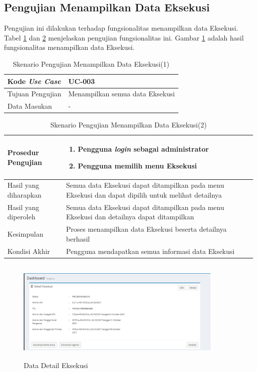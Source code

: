 \subsection{Pengujian Menampilkan Data Eksekusi}
Pengujian ini dilakukan terhadap fungsionalitas menampilkan data Eksekusi. Tabel \ref{tab:list_eksekusi_1} dan \ref{tab:list_eksekusi_2} menjelaskan pengujian fungsionalitas ini. Gambar \ref{figure:data_detail_eksekusi} adalah hasil fungsionalitas menampilkan data Eksekusi.

\begin{table}[h!]
	\centering
	\begin{tabular}{|p{4cm}|p{6cm}|}
	\hline
	Kode \textit{Use Case} & UC-003\\ \hline
	Tujuan Pengujian & Menampilkan semua data Eksekusi\\ \hline
	Data Masukan & - \\ \hline
	\end{tabular}\caption{Skenario Pengujian Menampilkan Data Eksekusi(1)}
	\label{tab:list_eksekusi_1}
\end{table}

\begin{table}[h!]
	\centering
	\begin{tabular}{|p{4cm}|p{6cm}|}
	\hline
	Prosedur Pengujian & 
		\begin{enumerate}
		\item Pengguna \textit{login} sebagai administrator
		\item Pengguna memilih menu Eksekusi
		\end{enumerate}\\ \hline
	Hasil yang diharapkan & Semua data Eksekusi dapat ditampilkan pada menu Eksekusi dan dapat dipilih untuk melihat detailnya \\ \hline
	Hasil yang diperoleh & Semua data Eksekusi dapat ditampilkan pada menu Eksekusi dan detailnya dapat ditampilkan\\ \hline
	Kesimpulan & Proses menampilkan data Eksekusi beserta detailnya berhasil\\ \hline
	Kondisi Akhir & Pengguna mendapatkan semua informasi data Eksekusi\\ \hline
	\end{tabular}\caption{Skenario Pengujian Menampilkan Data Eksekusi(2)}
		\label{tab:list_eksekusi_2}
\end{table}

\begin{figure}[h!]
\centerline
{\includegraphics[width=10cm,height=5cm]{bab6/detailExecution.png}}
\caption{Data Detail Eksekusi}
\label{figure:data_detail_eksekusi}
\end{figure}

